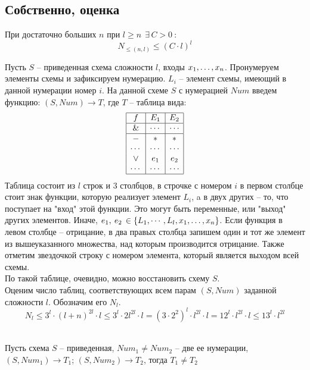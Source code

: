 \subsection{Собственно, оценка}
\begin{lemma}
При достаточно больших $n$ при $l\geq n \:\: \exists \, C>0 \: : $\\
$$N_{\leq(n,l)}\leq (C\cdot l)^l $$
\end{lemma}
Пусть $S$ -- приведенная схема сложности $l$, входы $x_1, \ldots, x_n$.
Пронумеруем элементы схемы и зафиксируем нумерацию. $L_i$ -- элемент схемы, имеющий в данной нумерации номер $i$. На данной схеме $S$ с нумерацией $Num$ введем функцию:
$(S,Num)\rightarrow T$, где $T$ -- таблица вида:
$$
    \begin{array}{|c|c|c|}
    \hline
    f & E_1 & E_2 \\
    \hline
    \& & \cdots &  \cdots \\
    \hline
     - & * & * \\
     \cdots & \cdots & \cdots \\
    \vee & e_1 & e_2 \\
     \cdots & \cdots & \cdots \\
    \hline
    \end{array}
    $$
Таблица состоит из $l$ строк и $3$ столбцов, в строчке с номером $i$ в первом столбце стоит знак функции, которую реализует элемент $L_i$, a в двух других -- то, что поступает на "вход"  этой функции. Это могут быть переменные, или "выход"  других элементов. Иначе, $e_1, \:e_2\, \in \{ L_1, \cdots ,L_l, x_1, \ldots, x_n\} $. Если функция в левом столбце -- отрицание, в два правых столбца запишем один и тот же элемент из вышеуказанного множества, над которым производится отрицание. Также отметим звездочкой строку с номером элемента, который является выходом всей схемы. \\
По такой таблице, очевидно, можно восстановить схему $S$.\\
Оценим число таблиц, соответствующих всем парам $(S,Num)$ заданной сложности $l$. Обозначим его $N_{l}$.\\
$$ N_l\leq 3^l\cdot (l+n)^{2l} \cdot l \leq 3^l \cdot 2l^{2l}\cdot l = (3\cdot 2^2)^l\cdot l^{2l}\cdot l = 12^l \cdot l^{2l} \cdot l \leq 13^l\cdot l^{2l}$$\\
\begin{statement}
Пусть схема $S$ -- приведенная, $Num_1 \neq Num_2$ -- две ее нумерации, $(S, Num_1) \rightarrow T_1$;  $(S, Num_2) \rightarrow T_2$, тогда $T_1 \neq T_2$
\end{statement}
